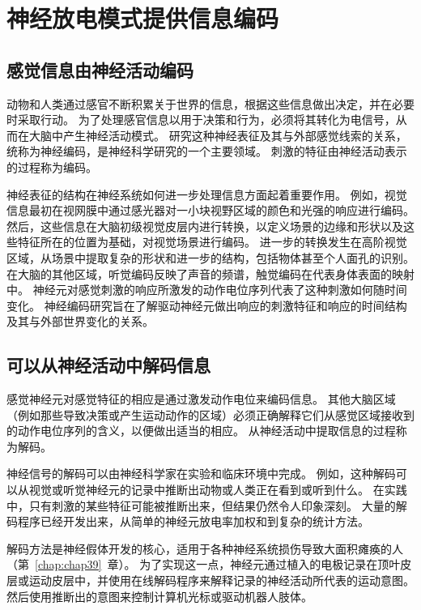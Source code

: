 \section{神经放电模式提供信息编码}

\subsection{感觉信息由神经活动编码}

动物和人类通过感官不断积累关于世界的信息，根据这些信息做出决定，并在必要时采取行动。
为了处理感官信息以用于决策和行为，必须将其转化为电信号，从而在大脑中产生神经活动模式。
研究这种神经表征及其与外部感觉线索的关系，统称为神经编码，是神经科学研究的一个主要领域。
刺激的特征由神经活动表示的过程称为编码。


神经表征的结构在神经系统如何进一步处理信息方面起着重要作用。
例如，视觉信息最初在视网膜中通过感光器对一小块视野区域的颜色和光强的响应进行编码。
然后，这些信息在大脑初级视觉皮层内进行转换，以定义场景的边缘和形状以及这些特征所在的位置为基础，对视觉场景进行编码。
进一步的转换发生在高阶视觉区域，从场景中提取复杂的形状和进一步的结构，包括物体甚至个人面孔的识别。
在大脑的其他区域，听觉编码反映了声音的频谱，触觉编码在代表身体表面的映射中。
神经元对感觉刺激的响应所激发的动作电位序列代表了这种刺激如何随时间变化。
神经编码研究旨在了解驱动神经元做出响应的刺激特征和响应的时间结构及其与外部世界变化的关系。



\subsection{可以从神经活动中解码信息}

感觉神经元对感觉特征的相应是通过激发动作电位来编码信息。
其他大脑区域（例如那些导致决策或产生运动动作的区域）必须正确解释它们从感觉区域接收到的动作电位序列的含义，以便做出适当的相应。
从神经活动中提取信息的过程称为解码。


神经信号的解码可以由神经科学家在实验和临床环境中完成。
例如，这种解码可以从视觉或听觉神经元的记录中推断出动物或人类正在看到或听到什么。
在实践中，只有刺激的某些特征可能被推断出来，但结果仍然令人印象深刻。
大量的解码程序已经开发出来，从简单的神经元放电率加权和到复杂的统计方法。


解码方法是神经假体开发的核心，适用于各种神经系统损伤导致大面积瘫痪的人（第~\ref{chap:chap39}~章）。
为了实现这一点，神经元通过植入的电极记录在顶叶皮层或运动皮层中，并使用在线解码程序来解释记录的神经活动所代表的运动意图。
然后使用推断出的意图来控制计算机光标或驱动机器人肢体。



